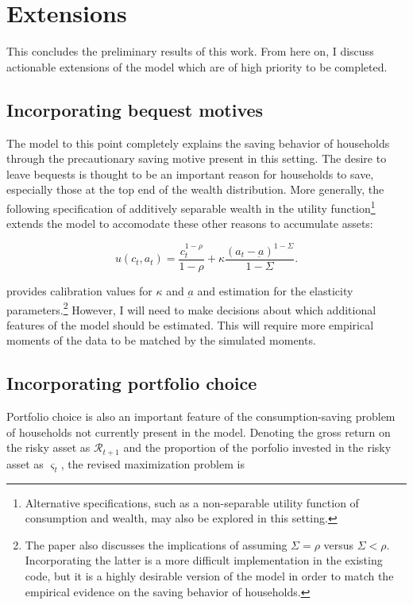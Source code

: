 \documentclass[\econtexRoot/Chp1proposal]{subfiles}
\begin{document}
\hypertarget{extensions}{}
\section{Extensions}\notinsubfile{\label{sec:extensions}}

This concludes the preliminary results of this work. From here on, I discuss actionable extensions of the model which are of high priority to be completed.

\subsection{Incorporating bequest motives}

\par The model to this point completely explains the saving behavior of households through the precautionary saving motive present in this setting. The desire to leave bequests is thought to be an important reason for households to save, especially those at the top end of the wealth distribution. More generally, the following specification of additively separable wealth in the utility function\footnote{Alternative specifications, such as a non-separable utility function of consumption and wealth, may also be explored in this setting.} extends the model to accomodate these other reasons to accumulate assets:

$$u(c_t, a_t) = \frac{c_{t}^{1-\rho}}{1-\rho} + \kappa \frac{(a_{t}-\underbar{a})^{1-\Sigma}}{1-\Sigma}.$$

\par \cite{ls2019} provides calibration values for $\kappa$ and $\underbar{a}$ and estimation for the elasticity parameters.\footnote{The paper also discusses the implications of assuming $\Sigma = \rho$ versus $\Sigma < \rho$. Incorporating the latter is a more difficult implementation in the existing code, but it is a highly desirable version of the model in order to match the empirical evidence on the saving behavior of households.} However, I will need to make decisions about which additional features of the model should be estimated. This will require more empirical moments of the data to be matched by the simulated moments.

\subsection{Incorporating portfolio choice}

\par Portfolio choice is also an important feature of the consumption-saving problem of households not currently present in the model. Denoting the gross return on the risky asset as $\mathcal{R}_{t+1}$ and the proportion of the porfolio invested in the risky asset as $\varsigma_t$, the revised maximization problem is
\end{document}
